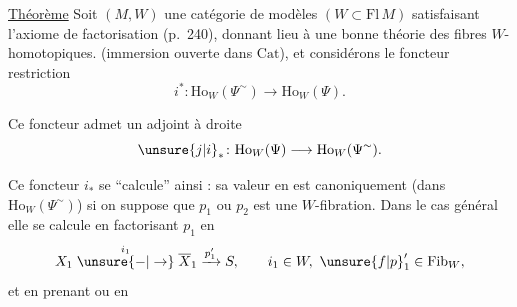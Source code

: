 
\uline{Théorème} Soit $(M,W)$ une catégorie de modèles $(W\subset\mathrm{Fl}\,M)$ satisfaisant l'axiome de factorisation  (p.~240), donnant  lieu à une bonne théorie des  fibres $W$-homotopiques. 
(immersion ouverte dans $\mathrm{Cat}$), et considérons le foncteur restriction
\[
i^*\colon\mathrm{Ho}_W(\Psi^{\sim})\longrightarrow\mathrm{Ho}_W(\Psi).
\]

Ce foncteur admet un adjoint à droite
\[
\unsure{j|i}_*\colon\mathrm{Ho}_W(\Psi)\longrightarrow\mathrm{Ho}_W(\Psi^{\sim}).
\]

Ce foncteur $i_*$ se ``calcule'' ainsi : sa valeur en
est canoniquement  (dans $\mathrm{Ho}_W(\Psi^{\sim})$) 
si on suppose que $p_1$ ou $p_2$ est une $W$-fibration. Dans le cas général elle se calcule en factorisant $p_1$  en
\[
X_1\mathrel{\overset{i_1}{\unsure{-|\to}}}\overline X_1\xrightarrow{p'_1}S,\qquad i_1\in W,\ \unsure{f|p}'_1\in\mathrm{Fib}_W,
\]
et en prenant
ou en
